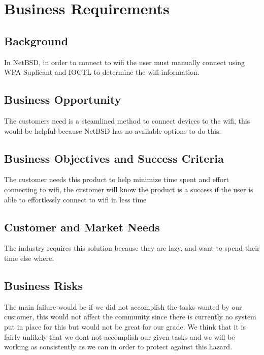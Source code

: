 \section{Business Requirements}
\subsection{Background}

In NetBSD, in order to connect to wifi the user must manually connect using WPA Suplicant and IOCTL to determine the wifi information.

\subsection{Business Opportunity}

The customers need is a steamlined method to connect devices to the wifi, this would be helpful because NetBSD has no available options to do this.

\subsection{Business Objectives and Success Criteria}

The customer needs this product to help minimize time spent and effort connecting to wifi, the customer will know the product is a success if the user is able to effortlessly connect to wifi in less time

\subsection{Customer and Market Needs}

The industry requires this solution because they are lazy, and want to spend their time else where.

\subsection{Business Risks}

The main failure would be if we did not accomplish the tasks wanted by our customer, this would not affect the community since there is currently no system put in place for this but would not be great for our grade. We think that it is fairly unlikely that we dont not accomplish our given tasks and we will be working as consistently as we can in order to protect against this hazard.

